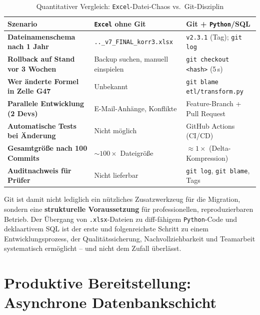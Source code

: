 ﻿\documentclass[12pt,a4paper]{report}
\theoremstyle{definition}
\theoremstyle{remark}
\newcommand{\excel}{\texttt{Excel}}
\newcommand{\py}{\texttt{Python}}
\newcommand{\code}[1]{\texttt{#1}}
\begin{document}
\begin{table}[H]
\centering
\caption{Quantitativer Vergleich: \excel-Datei-Chaos vs.\ Git-Disziplin}
\label{tab:git-quantitativ}
\renewcommand{\arraystretch}{1.4}
\begin{tabularx}{\linewidth}{>{\footnotesize\bfseries}l
                              >{\footnotesize}X
                              >{\footnotesize}X}
\toprule
Szenario                        & \excel{} ohne Git              & Git + \py{}/SQL \\
\midrule
Dateinamenschema nach 1 Jahr    & \code{..\_v7\_FINAL\_korr3.xlsx} & \code{v2.3.1} (Tag); \code{git log} \\
Rollback auf Stand vor 3 Wochen & Backup suchen, manuell einspielen & \code{git checkout <hash>} (5\,s) \\
Wer änderte Formel in Zelle G47 & Unbekannt                       & \code{git blame etl/transform.py} \\
Parallele Entwicklung (2 Devs)  & E-Mail-Anhänge, Konflikte       & Feature-Branch + Pull Request \\
Automatische Tests bei Änderung & Nicht möglich                   & GitHub Actions (CI/CD) \\
Gesamtgröße nach 100 Commits    & $\sim100\times$ Dateigröße      & $\approx 1\times$ (Delta-Kompression) \\
Auditnachweis für Prüfer        & Nicht lieferbar                 & \code{git log}, \code{git blame}, Tags \\
\bottomrule
\end{tabularx}
\end{table}

Git ist damit nicht lediglich ein nützliches Zusatzwerkzeug für die
Migration, sondern eine \textbf{strukturelle Voraussetzung} für
professionellen, reproduzierbaren Betrieb.
Der Übergang von \code{.xlsx}-Dateien zu diff-fähigem \py-Code und
deklaartivem SQL ist der erste und folgenreichste Schritt zu einem
Entwicklungsprozess, der Qualitätssicherung, Nachvollziehbarkeit
und Teamarbeit systematisch ermöglicht -- und nicht dem Zufall
überlässt.

\newpage
\chapter{Produktive Bereitstellung: Asynchrone Datenbankschicht}
\label{sec:prod}
\end{document}
